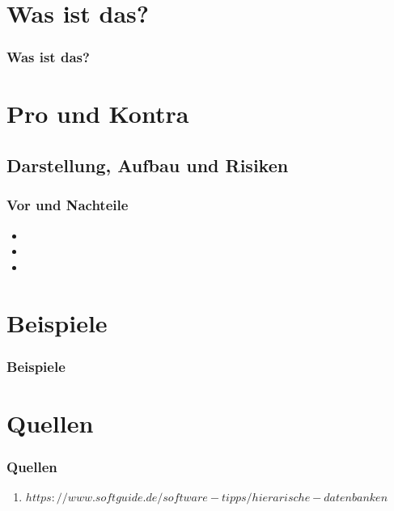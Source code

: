 \documentclass[hyperref={pdfpagelabels=false}]{beamer}
\begin{document}
\begin{frame}
\titlepage
\end{frame} 

\section{Was ist das?} 
\begin{frame}
\frametitle {Was ist das?}
\end{frame}



\section{Pro und Kontra} 
\subsection{Darstellung, Aufbau und Risiken}


\begin{frame}
\frametitle{Vor und Nachteile}
\begin{itemize}[<+->]
\item  
\item  
\item  
\end{itemize} 
\end{frame}

\section{Beispiele} 
\begin{frame}
\frametitle{Beispiele}
\end{frame}

\section{Quellen}
\begin{frame}
\frametitle{Quellen}
\begin{enumerate} 
\item $https://www.softguide.de/software-tipps/hierarische-datenbanken$
\end{enumerate}
\end{frame}
\end{document}
